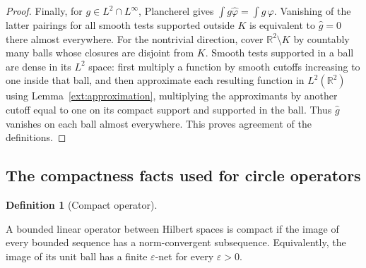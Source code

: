 \documentclass[11pt]{amsart}
\newcommand{\R}{\mathbb R}
\theoremstyle{definition}
\newtheorem{definition}[theorem]{Definition}
\theoremstyle{remark}
\numberwithin{equation}{section}
\providecommand{\lean}[1]{}
\begin{document}
\begin{proof}
Finally, for $g\in L^2\cap L^\infty$, Plancherel gives
$\int g\widehat\varphi=\int\widehat g\,\varphi$.
Vanishing of the latter pairings for all smooth tests supported
outside $K$ is equivalent to $\widehat g=0$ there almost everywhere.
For the nontrivial direction, cover $\R^2\setminus K$ by countably
many balls whose closures are disjoint from $K$.  Smooth tests supported
in a ball are dense in its $L^2$ space: first multiply a function by
smooth cutoffs increasing to one inside that ball, and then approximate
each resulting function in $L^2(\R^2)$ using
Lemma~\ref{ext:approximation}, multiplying the approximants by another
cutoff equal to one on its compact support and supported in the ball.
Thus $\widehat g$ vanishes on each ball almost everywhere.
This proves agreement of the definitions.
\end{proof}

\subsection{The compactness facts used for circle operators}

\begin{definition}[Compact operator]\label{ext:compact-definition}
\lean{IsCompactOperator}
A bounded linear operator between Hilbert spaces is compact if
the image of every bounded sequence has a norm-convergent
subsequence.  Equivalently, the image of its unit ball has a
finite $\varepsilon$-net for every $\varepsilon>0$.
\end{definition}
\end{document}
